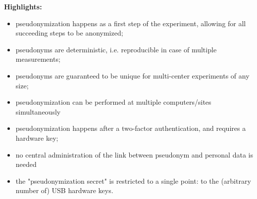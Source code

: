 \textbf{Highlights: }
\begin{itemize}
    \item pseudonymization happens as a first step of the experiment, allowing for all succeeding steps to be anonymized;
    \item pseudonyms are deterministic, i.e. reproducible in case of multiple measurements;
    \item pseudonyms are guaranteed to be unique for multi-center experiments of any size;
    \item pseudonymization can be performed at multiple computers/sites simultaneously
    \item pseudonymization happens after a two-factor authentication, and requires a hardware key;
    \item no central administration of the link between pseudonym and personal data is needed
    \item the "pseudonymization secret" is restricted to a single point: to the (arbitrary number of) USB hardware keys.
\end{itemize}




